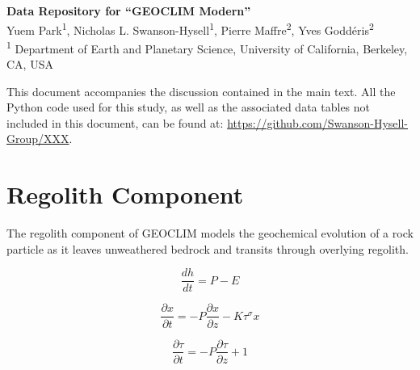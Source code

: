 \documentclass[11pt,letterpaper]{article}
\begin{document}
\begin{flushleft}
{\Large \textbf{Data Repository for ``GEOCLIM Modern''}}
\\
Yuem Park\textsuperscript{1},
Nicholas L. Swanson-Hysell\textsuperscript{1},
Pierre Maffre\textsuperscript{2},
Yves Godd\'eris\textsuperscript{2}
\\
\bigskip
\textsuperscript{1} Department of Earth and Planetary Science, University of California, Berkeley, CA, USA
\\
\bigskip

\end{flushleft}

\linenumbers

This document accompanies the discussion contained in the main text. All the Python code used for this study, as well as the associated data tables not included in this document, can be found at: \url{https://github.com/Swanson-Hysell-Group/XXX}.

\section*{Regolith Component}

The regolith component of GEOCLIM models the geochemical evolution of a rock particle as it leaves unweathered bedrock and transits through overlying regolith.

\begin{equation}
    \frac{dh}{dt} = P - E
\end{equation}

\begin{equation}
    \frac{\partial x}{\partial t} = -P \frac{\partial x}{\partial z} - K \tau^{\sigma}x
\end{equation}

\begin{equation}
    \frac{\partial \tau}{\partial t} = -P \frac{\partial \tau}{\partial z} + 1
\end{equation}

\clearpage

\singlespacing

\newpage



\end{document}
